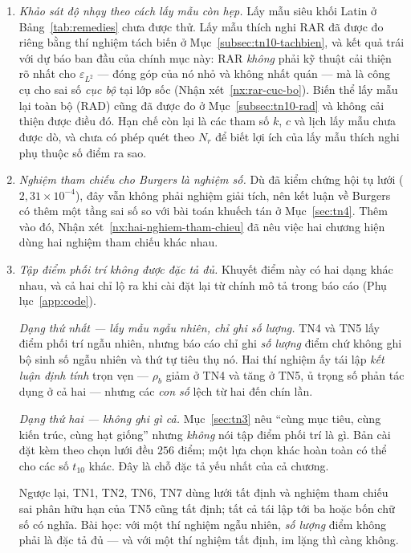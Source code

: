 \begin{enumerate}[label=(\arabic*),leftmargin=2.2em,itemsep=4pt]
\item \emph{Khảo sát độ nhạy theo cách lấy mẫu còn hẹp.} Lấy mẫu siêu khối Latin
ở Bảng~\ref{tab:remedies} chưa được thử. Lấy mẫu thích nghi RAR đã được đo riêng
bằng thí nghiệm tách biến ở Mục~\ref{subsec:tn10-tachbien}, và kết quả trái với
dự báo ban đầu của chính mục này: RAR \emph{không} phải kỹ thuật cải thiện rõ
nhất cho $\varepsilon_{L^2}$ --- đóng góp của nó nhỏ và không nhất quán --- mà
là công cụ cho sai số \emph{cục bộ} tại lớp sốc
(Nhận xét~\ref{nx:rar-cuc-bo}). Biến thể lấy mẫu lại toàn bộ (RAD) cũng đã được
đo ở Mục~\ref{subsec:tn10-rad} và không cải thiện được điều đó. Hạn chế còn lại
là các tham số $k$, $c$ và lịch lấy mẫu chưa được dò, và chưa có phép quét theo
$N_r$ để biết lợi ích của lấy mẫu thích nghi phụ thuộc số điểm ra sao.
 
\item \emph{Nghiệm tham chiếu cho Burgers là nghiệm số.} Dù đã kiểm chứng hội tụ
lưới ($2{,}31\times10^{-4}$), đây vẫn không phải nghiệm giải tích, nên kết luận về
Burgers có thêm một tầng sai số so với bài toán khuếch tán ở
Mục~\ref{sec:tn4}. Thêm vào đó,
Nhận xét~\ref{nx:hai-nghiem-tham-chieu} đã nêu việc hai chương hiện dùng hai nghiệm
tham chiếu khác nhau.
 
\item \emph{Tập điểm phối trí không được đặc tả đủ.} Khuyết điểm này có hai
dạng khác nhau, và cả hai chỉ lộ ra khi cài đặt lại từ chính mô tả trong báo
cáo (Phụ lục~\ref{app:code}).

\emph{Dạng thứ nhất --- lấy mẫu ngẫu nhiên, chỉ ghi số lượng.} TN4 và TN5 lấy
điểm phối trí ngẫu nhiên, nhưng báo cáo chỉ ghi \emph{số lượng} điểm chứ không
ghi bộ sinh số ngẫu nhiên và thứ tự tiêu thụ nó. Hai thí nghiệm ấy tái lập
\emph{kết luận định tính} trọn vẹn --- $\rho_b$ giảm ở TN4 và tăng ở TN5, ủ
trọng số phản tác dụng ở cả hai --- nhưng các \emph{con số} lệch từ hai đến chín
lần.

\emph{Dạng thứ hai --- không ghi gì cả.} Mục~\ref{sec:tn3} nêu ``cùng mục tiêu,
cùng kiến trúc, cùng hạt giống'' nhưng \emph{không} nói tập điểm phối trí là gì.
Bản cài đặt kèm theo chọn lưới đều $256$ điểm; một lựa chọn khác hoàn toàn có
thể cho các số $t_{10}$ khác. Đây là chỗ đặc tả yếu nhất của cả chương.

Ngược lại, TN1, TN2, TN6, TN7 dùng lưới tất định và nghiệm tham chiếu sai phân
hữu hạn của TN5 cũng tất định; tất cả tái lập tới ba hoặc bốn chữ số có nghĩa.
Bài học: với một thí nghiệm ngẫu nhiên, \emph{số lượng} điểm không phải là đặc
tả đủ --- và với một thí nghiệm tất định, im lặng thì càng không.


\end{enumerate}
